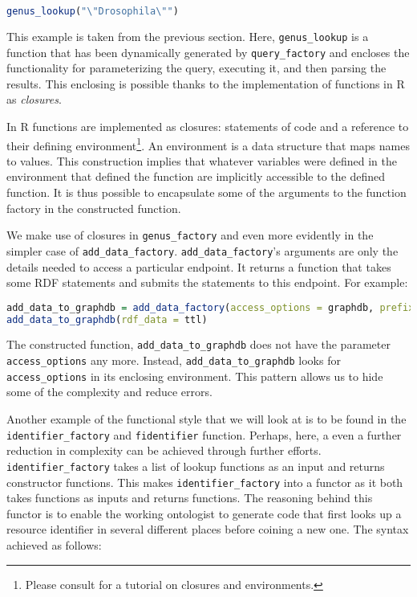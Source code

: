 \begin{lstlisting}[language=R,
style=customr]
genus_lookup("\"Drosophila\"")
\end{lstlisting}

This example is taken from the previous section. Here, {\tt genus\_lookup} is a function that has been dynamically generated by {\tt query\_factory} and encloses the functionality for parameterizing the query, executing it, and then parsing the results. This enclosing is possible thanks to the implementation of functions in R as \emph{closures}.

In R functions are implemented as closures: statements of code and a reference to their defining environment\footnote{Please consult \cite{wickham_advanced_2015} for a tutorial on closures and environments.}. An environment is a data structure that maps names to values. This construction implies that whatever variables were defined in the environment that defined the function are implicitly accessible to the defined function. It is thus possible to encapsulate some of the arguments to the function factory in the constructed function.

We make use of closures in {\tt genus\_factory} and even more evidently in the simpler case of {\tt add\_data\_factory}. {\tt add\_data\_factory}'s arguments are only the details needed to access a particular endpoint. It returns a function that takes some RDF statements and submits the statements to this endpoint. For example:

\begin{lstlisting}[language=R,
style=customr]
add_data_to_graphdb = add_data_factory(access_options = graphdb, prefixes = prefixes)
add_data_to_graphdb(rdf_data = ttl)
\end{lstlisting}

The constructed function, {\tt add\_data\_to\_graphdb} does not have the parameter {\tt access\_options} any more. Instead, {\tt add\_data\_to\_graphdb} looks for {\tt access\_options} in its enclosing environment. This pattern allows us to hide some of the complexity and reduce errors.

Another example of the functional style that we will look at is to be found in the {\tt identifier\_factory} and {\tt fidentifier} function. Perhaps, here, a even a further reduction in complexity can be achieved through further efforts. {\tt identifier\_factory} takes a list of lookup functions as an input and returns constructor functions. This makes {\tt identifier\_factory} into a functor as it both takes functions as inputs and returns functions. The reasoning behind this functor is to enable the working ontologist to generate code that first looks up a resource identifier in several different places before coining a new one. The syntax achieved as follows:


